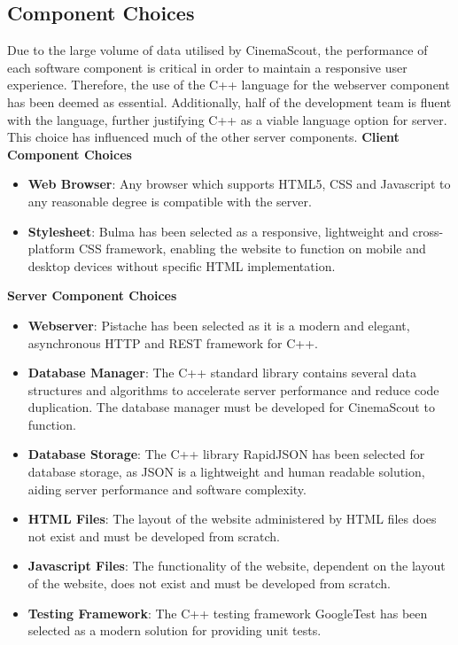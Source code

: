 \documentclass{article}
\begin{document}
\subsection{Component Choices}
Due to the large volume of data utilised by CinemaScout, the performance of each
software component is critical in order to maintain a responsive user experience.
Therefore, the use of the C++ language for the webserver component has been
deemed as essential. Additionally, half of the development team is fluent with
the language, further justifying C++ as a viable language option for server.
This choice has influenced much of the other server components.\newline\newline
\textbf{Client Component Choices}
\begin{itemize}
\item \textbf{Web Browser}: Any browser which supports HTML5, CSS and Javascript
to any reasonable degree is compatible with the server.
\item \textbf{Stylesheet}: Bulma has been selected as a responsive, lightweight
and cross-platform CSS framework, enabling the website to function on mobile
and desktop devices without specific HTML implementation.
\end{itemize}
\textbf{Server Component Choices}
\begin{itemize}
\item \textbf{Webserver}: Pistache has been selected as it is a modern and
elegant, asynchronous HTTP and REST framework for C++.
\item \textbf{Database Manager}: The C++ standard library contains several
data structures and algorithms to accelerate server performance and reduce
code duplication. The database manager must be developed for CinemaScout
to function.
\item \textbf{Database Storage}: The C++ library RapidJSON has been selected
for database storage, as JSON is a lightweight and human readable solution,
aiding server performance and software complexity.
\item \textbf{HTML Files}: The layout of the website administered by HTML files
does not exist and must be developed from scratch.
\item \textbf{Javascript Files}: The functionality of the website, dependent
on the layout of the website, does not exist and must be developed from scratch.
\item \textbf{Testing Framework}: The C++ testing framework GoogleTest has
been selected as a modern solution for providing unit tests.
\end{itemize}
\end{document}
